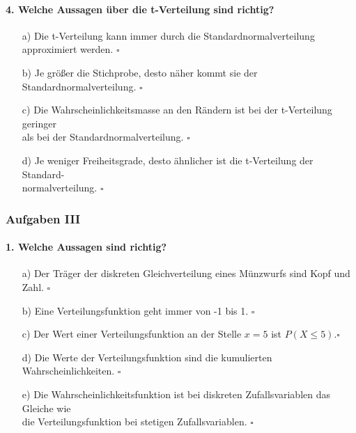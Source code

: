 \documentclass[a4paper]{article}
\begin{document}
\paragraph{4. Welche Aussagen über die t-Verteilung sind richtig?}
\begin{itemize}
    \item[a)] Die t-Verteilung kann immer durch die Standardnormalverteilung approximiert werden. \hfill $\square$
    \item[b)] Je größer die Stichprobe, desto näher kommt sie der Standardnormalverteilung. \hfill $\square$
    \item[c)] Die Wahrscheinlichkeitsmasse an den Rändern ist bei der t-Verteilung geringer \\als bei der Standardnormalverteilung. \hfill $\square$
    \item[d)] Je weniger Freiheitsgrade, desto ähnlicher ist die t-Verteilung der Standard-\\normalverteilung. \hfill $\square$
\end{itemize}

\clearpage

\subsubsection{Aufgaben III}
\paragraph{1. Welche Aussagen sind richtig?}
\begin{itemize}
    \item[a)] Der Träger der diskreten Gleichverteilung eines Münzwurfs sind Kopf und Zahl. \hfill $\square$
    \item[b)] Eine Verteilungsfunktion geht immer von -1 bis 1. \hfill $\square$
    \item[c)] Der Wert einer Verteilungsfunktion an der Stelle $x=5$ ist $P(X\leq 5)$.\hfill $\square$
    \item[d)] Die Werte der Verteilungsfunktion sind die kumulierten Wahrscheinlichkeiten. \hfill $\square$
    \item[e)] Die Wahrscheinlichkeitsfunktion ist bei diskreten Zufallsvariablen das Gleiche wie \\die Verteilungsfunktion bei stetigen Zufallsvariablen. \hfill $\square$
\end{itemize}
\end{document}
